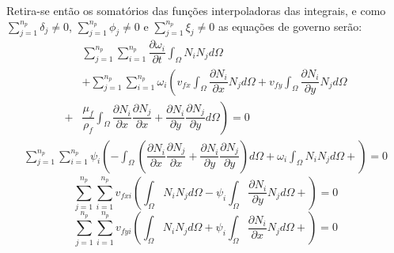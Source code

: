 Retira-se então os somatórios das funções interpoladoras das integrais, e como $\sum_{j=1}^{n_p} \delta_j \neq 0$, $\sum_{j=1}^{n_p} \phi_j \neq 0$ e $\sum_{j=1}^{n_p} \xi_j \neq 0$ as equações de governo serão:
\begin{align}
    &\sum_{j=1}^{n_p}
    \sum_{i=1}^{n_p} \dfrac{\partial \omega_i}{\partial t}
    \int_{\Omega}
    N_i N_j
    d\Omega \nonumber\\&+
    \sum_{j=1}^{n_p}
    \sum_{i=1}^{n_p}
    \omega_i
    \left(
        v_{fx}
        \int_{\Omega}
        \dfrac{\partial N_i}{\partial x}
        N_j
        d\Omega +
        v_{fy}
        \int_{\Omega}
        \dfrac{\partial N_i}{\partial y}
        N_j
        d\Omega \right.\nonumber\\ +& \left.
        \dfrac{\mu_f}{\rho_f}
        \int_{\Omega}
        \dfrac{\partial N_i}{\partial x}
        \dfrac{\partial N_j}{\partial x} +
        \dfrac{\partial N_i}{\partial y}
        \dfrac{\partial N_j}{\partial y}
        d\Omega
    \right) = 0
\end{align}
\begin{align}
    \sum_{j=1}^{n_p}
    \sum_{i=1}^{n_p}
    \psi_i
    \left(
        -\int_{\Omega} \left(
        \dfrac{\partial N_i}{\partial x}
        \dfrac{\partial N_j}{\partial x} +
        \dfrac{\partial N_i}{\partial y}
        \dfrac{\partial N_j}{\partial y}
        \right) d\Omega +
        \omega_i
        \int_{\Omega}
        N_i
        N_j
        d\Omega +
    \right) = 0
\end{align}
\begin{equation}
    \sum_{j=1}^{n_p}
    \sum_{i=1}^{n_p}
    v_{fxi}
    \left(
        \int_{\Omega}
        N_i
        N_j
        d\Omega -
        \psi_i
        \int_{\Omega}
        \dfrac{\partial N_i}{\partial y}
        N_j
        d\Omega +
    \right) = 0
\end{equation}
\begin{equation}
    \sum_{j=1}^{n_p}
    \sum_{i=1}^{n_p}
    v_{fyi}
    \left(
        \int_{\Omega}
        N_i
        N_j
        d\Omega +
        \psi_i
        \int_{\Omega}
        \dfrac{\partial N_i}{\partial x}
        N_j
        d\Omega +
    \right) = 0
\end{equation}

